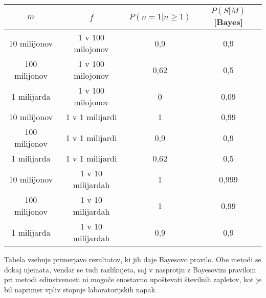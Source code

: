 \documentclass[12pt,a4paper]{amsart}
\theoremstyle{definition} %
\theoremstyle{plain} %
\begin{document}
\begin{table}[h!]
    \centering
    \begin{tabular}{c c c c} 
        \hline
        $m$ & $f$ & $P(n = 1 \lvert n \ge 1)$ & $P(S \lvert M)$[Bayes]\\ 
        \hline
        10 milijonov & 1 v 100 milojonov & 0,9 & 0,9 \\
        100 milijonov & 1 v 100 milojonov & 0,62 & 0,5 \\
        1 milijarda & 1 v 100 milojonov & 0 & 0,09 \\ \hline
        10 milijonov & 1 v 1 milijardi & 1 & 0,99 \\
        100 milijonov & 1 v 1 milijardi & 0,9 & 0,9 \\
        1 milijarda & 1 v 1 milijardi & 0,62 & 0,5 \\ \hline
        10 milijonov & 1 v 10 milijardah & 1 & 0,999 \\
        100 milijonov & 1 v 10 milijardah & 1 & 0,99 \\
        1 milijarda & 1 v 10 milijardah & 0,9 & 0,9 \\ \hline
    \end{tabular}
\end{table}
Tabela vsebuje primerjavo rezultatov, ki jih daje Bayesovo pravilo. Obe metodi se dokaj ujemata, vendar se tudi razlikujeta, saj v nasprotju 
z Bayesovim pravilom pri metodi edinstvenosti ni mogoče enostavno upoštevati številnih zapletov, kot je bil naprimer vpliv stopnje 
laboratorijskih napak. 

\end{document}
